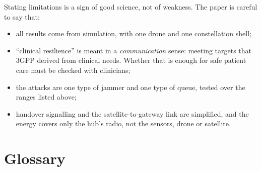 \documentclass[11pt,a4paper]{article}
\begin{document}
Stating limitations is a sign of good science, not of weakness. The paper is careful to say that:
\begin{itemize}
\item all results come from simulation, with one drone and one constellation shell;
\item ``clinical resilience'' is meant in a \emph{communication} sense: meeting targets that 3GPP derived from clinical needs. Whether that is enough for safe patient care must be checked with clinicians;
\item the attacks are one type of jammer and one type of queue, tested over the ranges listed above;
\item handover signalling and the satellite-to-gateway link are simplified, and the energy covers only the hub's radio, not the sensors, drone or satellite.
\end{itemize}

\section{Glossary}\label{sec:glossary}
\end{document}

